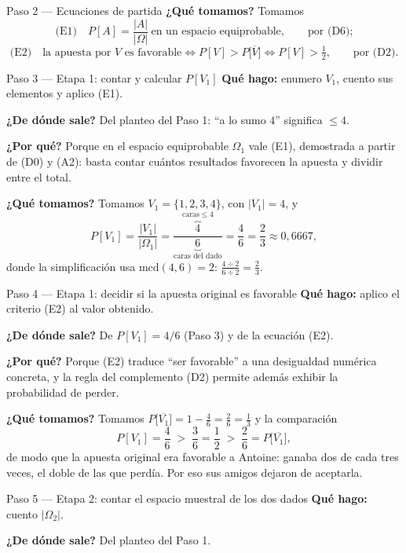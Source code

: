 \documentclass[11pt]{article}
\begin{document}
\begin{sol}
\begin{paso}{Paso 2 --- Ecuaciones de partida}
\textbf{¿Qué tomamos?} Tomamos
\[
\text{(E1)}\quad P[A]=\frac{|A|}{|\Omega|}\ \text{en un espacio equiprobable},\qquad\text{por (D6);}
\]
\[
\text{(E2)}\quad \text{la apuesta por } V \text{ es favorable}
\iff P[V]>P\big[\overline{V}\big] \iff P[V]>\tfrac12,\qquad\text{por (D2).}
\]
\end{paso}

\begin{paso}{Paso 3 --- Etapa 1: contar y calcular $P[V_1]$}
\textbf{Qué hago:} enumero $V_1$, cuento sus elementos y aplico (E1).

\textbf{¿De dónde sale?} Del planteo del Paso 1: ``a lo sumo $4$'' significa $\le 4$.

\textbf{¿Por qué?} Porque en el espacio equiprobable $\Omega_1$ vale (E1), demostrada a partir
de (D0) y (A2): basta contar cuántos resultados favorecen la apuesta y dividir entre el total.

\textbf{¿Qué tomamos?} Tomamos $V_1=\{1,2,3,4\}$, con $|V_1|=4$, y
\[
P[V_1]=\frac{|V_1|}{|\Omega_1|}
=\frac{\overbrace{4}^{\text{caras}\le 4}}{\underbrace{6}_{\text{caras del dado}}}
=\frac{4}{6}=\frac{2}{3}\approx 0{,}6667 ,
\]
donde la simplificación usa $\mathrm{mcd}(4,6)=2$: $\frac{4\div 2}{6\div 2}=\frac{2}{3}$.
\end{paso}

\begin{paso}{Paso 4 --- Etapa 1: decidir si la apuesta original es favorable}
\textbf{Qué hago:} aplico el criterio (E2) al valor obtenido.

\textbf{¿De dónde sale?} De $P[V_1]=4/6$ (Paso 3) y de la ecuación (E2).

\textbf{¿Por qué?} Porque (E2) traduce ``ser favorable'' a una desigualdad numérica concreta, y
la regla del complemento (D2) permite además exhibir la probabilidad de perder.

\textbf{¿Qué tomamos?} Tomamos $P\big[\overline{V_1}\big]=1-\frac{4}{6}=\frac{2}{6}=\frac13$ y
la comparación
\[
P[V_1]=\frac{4}{6}\;>\;\frac{3}{6}=\frac12\;>\;\frac{2}{6}=P\big[\overline{V_1}\big] ,
\]
de modo que la apuesta original era favorable a Antoine: ganaba dos de cada tres veces, el doble
de las que perdía. Por eso sus amigos dejaron de aceptarla.
\end{paso}

\begin{paso}{Paso 5 --- Etapa 2: contar el espacio muestral de los dos dados}
\textbf{Qué hago:} cuento $|\Omega_2|$.

\textbf{¿De dónde sale?} Del planteo del Paso 1.


\end{paso}
\end{sol}
\end{document}
